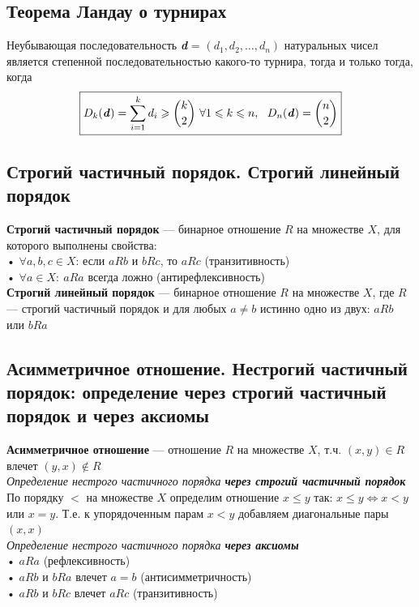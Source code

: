 \documentclass[a4paper]{article}
\begin{document}
\subsection{Теорема Ландау о турнирах}
Неубывающая последовательность \textbf{\textit{d}} = $(d_1,d_2,\ldots,d_n)$ натуральных чисел является степенной последовательностью какого-то турнира, тогда и только тогда, когда $$\boxed{D_k(\textbf{\textit{d}})=\sum_{i=1}^k d_i\geqslant\dbinom{k}{2}\ \forall 1\leqslant k \leqslant n,\ \ D_n(\textbf{\textit{d}})=\dbinom{n}{2}}$$

\subsection{Строгий частичный порядок. Строгий линейный порядок}
\textbf{Строгий частичный порядок} — бинарное отношение $R$ на множестве $X$, для которого выполнены свойства:\\[2mm]
\indent\indent• $\forall a,b,c\in X$: если $aRb$ и $bRc$, то $aRc$ (транзитивность)\\[2mm]
\indent\indent• $\forall a\in X:\ aRa$ всегда ложно (антирефлексивность)\\[3mm]
\indent\textbf{Строгий линейный порядок} — бинарное отношение $R$ на множестве $X$, где $R$ — строгий частичный порядок и для любых $a\ne b$ истинно одно из двух: $aRb$ или $bRa$

\subsection{Асимметричное отношение. Нестрогий частичный порядок: определение через строгий частичный порядок и через аксиомы}
\textbf{Асимметричное отношение} — отношение $R$ на множестве $X$, т.ч. $(x,y)\in R$ влечет $(y,x)\notin R$\\[2mm]
\textit{Определение нестрого частичного порядка \textbf{через строгий частичный порядок}}\\[2mm]
\indent По порядку $<$ на множестве $X$ определим отношение $x\leqslant y$ так: $x\leqslant y\iff x<y$ или $x=y$. Т.е. к упорядоченным парам $x<y$ добавляем диагональные пары $(x,x)$\\[3mm]
\textit{Определение нестрого частичного порядка \textbf{через аксиомы}}\\[2mm]
\indent• $aRa$ (рефлексивность)\\[2mm]
\indent• $aRb$ и $bRa$ влечет $a=b$ (антисимметричность)\\[2mm]
\indent• $aRb$ и $bRc$ влечет $aRc$ (транзитивность)
\end{document}
